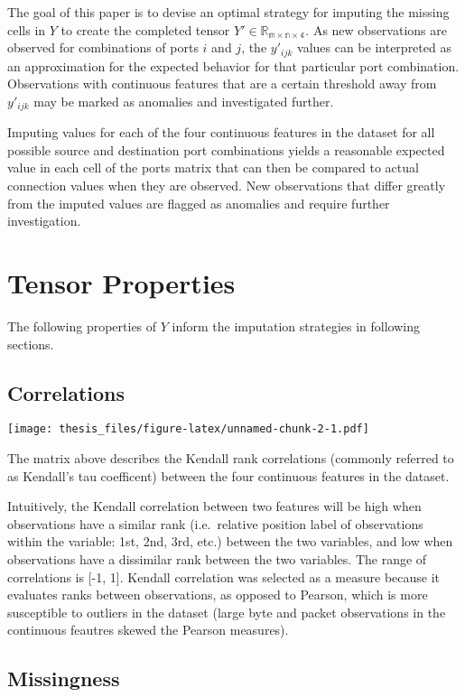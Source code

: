 \documentclass[12pt,twoside]{dukestatscithesis}
\theoremstyle{definition}
\theoremstyle{definition}
\theoremstyle{definition}
\theoremstyle{remark}
\begin{document}
The goal of this paper is to devise an optimal strategy for imputing the
missing cells in \(Y\) to create the completed tensor
\(Y' \in \mathbb{R_{m \times n \times 4}}\). As new observations are
observed for combinations of ports \(i\) and \(j\), the \(y'_{ijk}\)
values can be interpreted as an approximation for the expected behavior
for that particular port combination. Observations with continuous
features that are a certain threshold away from \(y'_{ijk}\) may be
marked as anomalies and investigated further.

Imputing values for each of the four continuous features in the dataset
for all possible source and destination port combinations yields a
reasonable expected value in each cell of the ports matrix that can then
be compared to actual connection values when they are observed. New
observations that differ greatly from the imputed values are flagged as
anomalies and require further investigation.

\section{Tensor Properties}\label{tensor-properties}

The following properties of \(Y\) inform the imputation strategies in
following sections.

\subsection{Correlations}\label{correlations}

\texttt{[image: thesis\_files/figure-latex/unnamed-chunk-2-1.pdf]}

The matrix above describes the Kendall rank correlations (commonly
referred to as Kendall's tau coefficent) between the four continuous
features in the dataset.

Intuitively, the Kendall correlation between two features will be high
when observations have a similar rank (i.e.~relative position label of
observations within the variable: 1st, 2nd, 3rd, etc.) between the two
variables, and low when observations have a dissimilar rank between the
two variables. The range of correlations is {[}-1, 1{]}. Kendall
correlation was selected as a measure because it evaluates ranks between
observations, as opposed to Pearson, which is more susceptible to
outliers in the dataset (large byte and packet observations in the
continuous feautres skewed the Pearson measures).

\subsection{Missingness}\label{missingness}
\end{document}
